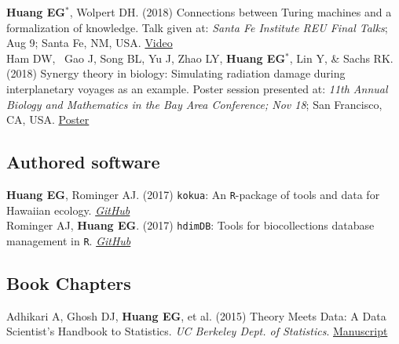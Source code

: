 \documentclass[10pt, letterpaper]{article}
\newcommand{\years}[1]{\marginnote{\scriptsize #1}}
\begin{document}
\noindent
\years{2018}\textbf{Huang EG}$^{*}$, Wolpert DH. (2018) Connections between Turing machines and a formalization of knowledge. Talk given at: \emph{Santa Fe Institute REU Final Talks}; Aug 9; Santa Fe, NM, USA. \href{https://www.youtube.com/watch?v=10bi_R47uYw&list=PLZlVBTf7N6GpTwEeQOlOmIfYN5J7zciZR&index=6&t=0s}{Video}\\

\years{2018}Ham DW,  Gao J, Song BL, Yu J, Zhao LY, \textbf{Huang EG}$^{*}$, Lin Y, \& Sachs RK. (2018) Synergy theory in biology: Simulating radiation damage during interplanetary voyages as an example. Poster session presented at: \emph{11th Annual Biology and Mathematics in the Bay Area Conference; Nov 18}; San Francisco, CA, USA. \href{https://github.com/sachsURAP/BaMBA_11/blob/master/Bamba17v3.pdf}{Poster}\\

\subsection*{Authored software}
\noindent
\years{2017}\textbf{Huang EG}, Rominger AJ. (2017) \lstinline{kokua}: An \lstinline{R}-package of tools and data for Hawaiian ecology. \emph{\href{https://github.com/hawaiiDimensions/kokua}{GitHub}}\\

\years{2016}Rominger AJ, \textbf{Huang EG}. (2017) \lstinline{hdimDB}: Tools for biocollections database management in \lstinline{R}. \emph{\href{https://github.com/hawaiiDimensions/db/tree/master/hdimDB}{GitHub}}\\

\subsection*{Book Chapters}
\noindent
\years{2015}Adhikari A, Ghosh DJ, \textbf{Huang EG}, et al. (2015) Theory Meets Data: A Data Scientist’s Handbook to Statistics. \emph{UC Berkeley Dept. of Statistics}. {\href{https://github.com/eghuang/stat_94}{Manuscript}}\\

\end{document}
